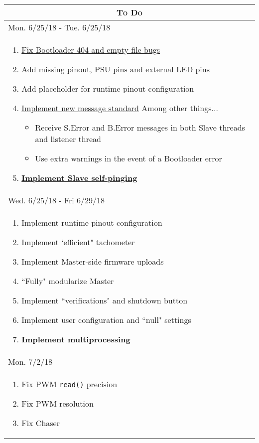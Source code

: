 \documentclass{article}
\begin{document}
\begin{center}
\renewcommand{\labelitemi}{-}
\begin{longtable}{| p{} |}
\hline
\multicolumn{1}{|c|}{\textsc{To Do}}\\*
\hline
\multicolumn{1}{|l|}{Mon. 6/25/18 - Tue. 6/25/18}\\*
\hline
\begin{enumerate}
	\item \underline{Fix Bootloader 404 and empty file bugs}
	\item Add missing pinout, PSU pins and external LED pins
	\item Add placeholder for runtime pinout configuration
	\item \underline{Implement new message standard}
		\linebreak\indent Among other things...
		\begin{itemize}
			\item Receive S.Error and B.Error messages in both Slave threads
				and listener thread
			\item Use extra warnings in the event of a Bootloader error
		\end{itemize}
	\item \textbf{\underline{Implement Slave self-pinging}}
\end{enumerate}\\
\hline
\multicolumn{1}{|l|}{Wed. 6/25/18 - Fri 6/29/18}\\*
\hline
\begin{enumerate}
	\item Implement runtime pinout configuration
	\item Implement `efficient" tachometer
	\item Implement Master-side firmware uploads
	\item ``Fully" modularize Master
	\item Implement ``verifications" and shutdown button
	\item Implement user configuration and ``null" settings
	\item \textbf{Implement multiprocessing}
\end{enumerate}\\
\hline
\multicolumn{1}{|l|}{Mon. 7/2/18}\\*
\hline
\begin{enumerate}
	\item Fix PWM \texttt{read()} precision
	\item Fix PWM resolution
	\item Fix Chaser

\end{enumerate}
\end{longtable}
\end{center}
\end{document}
